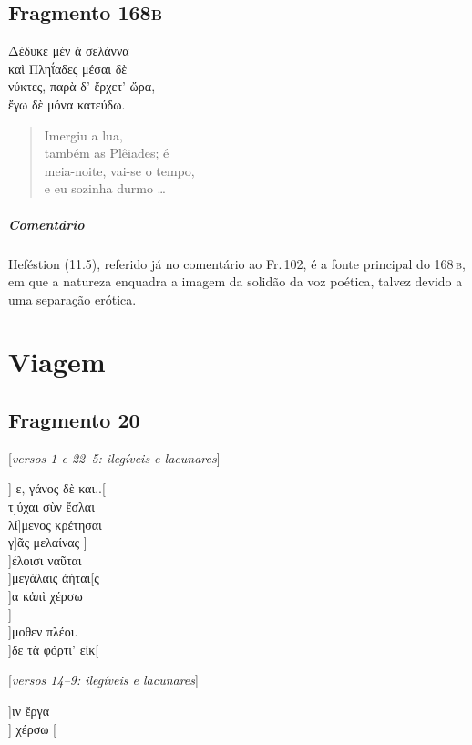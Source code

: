 \pagebreak
\section{Fragmento 168\textsc{b}}

\begin{gkverse}
Δέδυκε μὲν ἀ σελάννα\\
καὶ Πληΐαδες μέσαι δὲ\\
νύκτες, παρὰ δ’ ἔρχετ’ ὤρα,\\
ἔγω δὲ μόνα κατεύδω.
\end{gkverse}

\begin{verse}
Imergiu a lua,\\
também as Plêiades; é\\
meia-noite, vai-se o tempo,\\
e eu sozinha durmo \ldots{}
\end{verse}

\medskip

{\paragraph{Comentário} Heféstion (11.5), referido já no comentário ao Fr.\,102, é a fonte principal do 168\,\textsc{b}, em que a natureza enquadra a imagem da solidão da voz poética, talvez devido a uma separação erótica.}


\chapter{Viagem}

\section{Fragmento 20}

\begin{gkverse}
\textnormal{[\textit{versos 1 e 22--5: ilegíveis e lacunares}]}

] ε, γάνος δὲ και..[\\
τ]ύχαι σὺν ἔσλαι\\
         λί]μενος κρέτησαι\\
  γ]ᾶς μελαίνας
    ]\\
    ]έλοισι ναῦται\\
  ]μεγάλαις ἀήται[ς\\
  ]α κἀπὶ χέρσω\\
    ]\\
   ]μοθεν πλέοι.\\
  ]δε τὰ φόρτι’ εἰκ[

\textnormal{[\textit{versos 14--9: ilegíveis e lacunares}]}

]ιν ἔργα\\
] χέρσω [
\end{gkverse}

